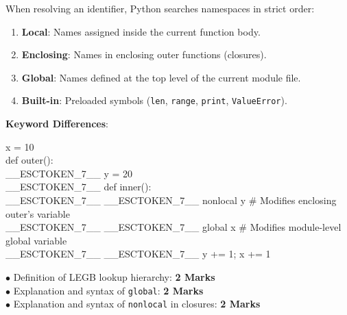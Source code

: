 \begin{solutionbox}
When resolving an identifier, Python searches namespaces in strict order:
\begin{enumerate}[leftmargin=1.5em]
    \item \textbf{Local}: Names assigned inside the current function body.
    \item \textbf{Enclosing}: Names in enclosing outer functions (closures).
    \item \textbf{Global}: Names defined at the top level of the current module file.
    \item \textbf{Built-in}: Preloaded symbols (\texttt{len}, \texttt{range}, \texttt{print}, \texttt{ValueError}).
\end{enumerate}
\textbf{Keyword Differences}:
\begin{pycode}
x = 10\\
def outer():\\
\_\_ESCTOKEN\_7\_\_ y = 20\\
\_\_ESCTOKEN\_7\_\_ def inner():\\
\_\_ESCTOKEN\_7\_\_ \_\_ESCTOKEN\_7\_\_ nonlocal y  \# Modifies enclosing outer's variable\\
\_\_ESCTOKEN\_7\_\_ \_\_ESCTOKEN\_7\_\_ global x    \# Modifies module-level global variable\\
\_\_ESCTOKEN\_7\_\_ \_\_ESCTOKEN\_7\_\_ y += 1; x += 1
\end{pycode}
\begin{markingrubric}
$\bullet$ Definition of LEGB lookup hierarchy: \textbf{2 Marks}\\
$\bullet$ Explanation and syntax of \texttt{global}: \textbf{2 Marks}\\
$\bullet$ Explanation and syntax of \texttt{nonlocal} in closures: \textbf{2 Marks}
\end{markingrubric}
\end{solutionbox}

